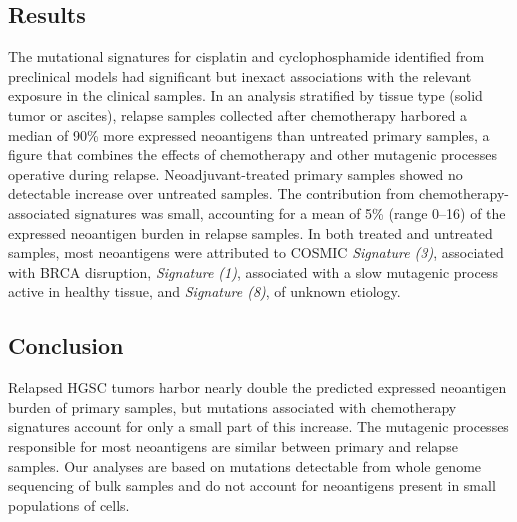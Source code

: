 \subsection*{Results}
The mutational signatures for cisplatin and cyclophosphamide identified from preclinical models had significant but inexact associations with the relevant exposure in the clinical samples. In an analysis stratified by tissue type (solid tumor or ascites), relapse samples collected after chemotherapy harbored a median of 90\% more expressed neoantigens than untreated primary samples, a figure that combines the effects of chemotherapy and other mutagenic processes operative during relapse. Neoadjuvant-treated primary samples showed no detectable increase over untreated samples. The contribution from chemotherapy-associated signatures was small, accounting for a mean of 5\% (range 0--16) of the expressed neoantigen burden in relapse samples. In both treated and untreated samples, most neoantigens were attributed to COSMIC \textit{Signature (3)}, associated with BRCA disruption, \textit{Signature (1)}, associated with a slow mutagenic process active in healthy tissue, and \textit{Signature (8)}, of unknown etiology.

\subsection*{Conclusion}
Relapsed HGSC tumors harbor nearly double the predicted expressed neoantigen burden of primary samples, but mutations associated with chemotherapy signatures account for only a small part of this increase. The mutagenic processes responsible for most neoantigens are similar between primary and relapse samples. Our analyses are based on mutations detectable from whole genome sequencing of bulk samples and do not account for neoantigens present in small populations of cells. 



